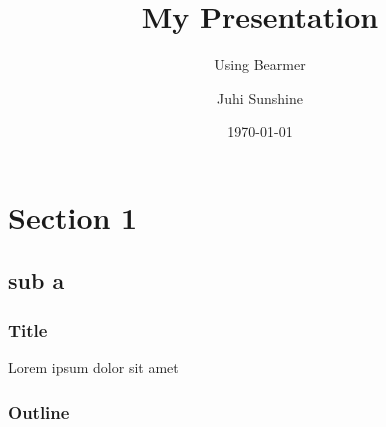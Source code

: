 \documentclass{beamer}
\title{My Presentation}
\subtitle{Using Bearmer}
\author{Juhi Sunshine}
\date{\today}
\begin{document}
\begin{frame}
    \titlepage
\end{frame}

\section{Section 1}
\subsection{sub a}

\begin{frame}
    \frametitle{Title}
    Lorem ipsum dolor sit amet
\end{frame}

\begin{frame}
    \frametitle{Outline}
    \tableofcontents
\end{frame}
\end{document}
